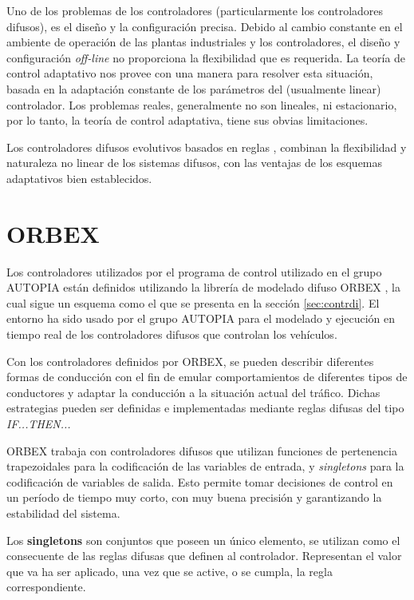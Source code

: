 Uno de los problemas de los controladores (particularmente los controladores difusos), es el diseño y la configuración precisa. Debido al cambio constante en el ambiente de operación de las plantas industriales y los controladores, el diseño y configuración \textit{off-line} no proporciona la flexibilidad que es requerida. La teoría de control adaptativo nos provee con una manera para resolver esta situación, basada en la adaptación constante de los parámetros del (usualmente linear) controlador. Los problemas reales, generalmente no son lineales, ni estacionario, por lo tanto, la teoría de control adaptativa, tiene sus obvias limitaciones.
 
Los controladores difusos evolutivos basados en reglas \cite{angelov04}\cite{Angelov02}, combinan la flexibilidad y naturaleza no linear de los sistemas difusos, con las ventajas de los esquemas adaptativos bien establecidos.  

\section{ORBEX} 
\label{sec:orbex}

Los controladores utilizados por el programa de control utilizado en el grupo AUTOPIA están definidos utilizando la librería de modelado difuso \gls{ORBEX} \cite{Garcia1998}, la cual sigue un esquema como el que se presenta en la sección \ref{sec:contrdi}. El entorno ha sido usado por el grupo AUTOPIA para el modelado y ejecución en tiempo real de los controladores difusos que controlan los vehículos. 

Con los controladores definidos por \gls{ORBEX}, se pueden describir diferentes formas de conducción con el fin de emular comportamientos de diferentes tipos de conductores y adaptar la conducción a la situación actual del tráfico. Dichas estrategias pueden ser definidas e implementadas mediante reglas difusas del tipo \textit{IF...THEN...}

\gls{ORBEX} trabaja con controladores difusos que utilizan funciones de pertenencia trapezoidales para la codificación de las variables de entrada, y \textit{\gls{singletons}} para la codificación de variables de salida. Esto permite tomar decisiones de control en un período de tiempo muy corto, con muy buena precisión y garantizando la estabilidad del sistema. 

Los \textbf{singletons} son conjuntos que poseen un único elemento, se utilizan como el consecuente de las reglas difusas que definen al controlador. Representan el valor que va ha ser aplicado, una vez que se active, o se cumpla, la regla correspondiente.

